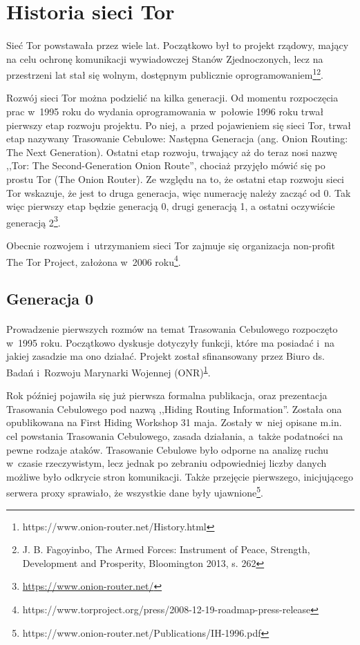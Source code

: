 \section{Historia sieci Tor}\paragraph{}

Sieć Tor powstawała przez wiele lat. Początkowo był to projekt rządowy, mający na celu ochronę komunikacji wywiadowczej Stanów Zjednoczonych, lecz na przestrzeni lat stał się wolnym, dostępnym publicznie oprogramowaniem\footnote{https://www.onion-router.net/History.html\label{hist}}\footnote{J. B. Fagoyinbo, The Armed Forces: Instrument of Peace, Strength, Development and Prosperity, Bloomington 2013, s. 262}. 

Rozwój sieci Tor można podzielić na kilka generacji. Od momentu rozpoczęcia prac w~1995 roku do wydania oprogramowania w~połowie 1996 roku trwał pierwszy etap rozwoju projektu. Po niej, a~przed pojawieniem się sieci Tor, trwał etap nazywany Trasowanie Cebulowe: Następna Generacja (ang. Onion Routing: The Next Generation). Ostatni etap rozwoju, trwający aż do teraz nosi nazwę ,,Tor: The Second-Generation Onion Route'', chociaż przyjęło mówić się po prostu Tor (The Onion Router). Ze względu na to, że ostatni etap rozwoju sieci Tor wskazuje, że jest to druga generacja, więc numerację należy zacząć od 0. Tak więc pierwszy etap będzie generacją 0, drugi generacją 1, a ostatni oczywiście generacją 2\footnote{\url{https://www.onion-router.net/}\label{onionrouter}}.

Obecnie rozwojem i~utrzymaniem sieci Tor zajmuje się organizacja non-profit The Tor Project, założona w~2006 roku\footnote{https://www.torproject.org/press/2008-12-19-roadmap-press-release}.

\subsection{Generacja 0}\paragraph{}
Prowadzenie pierwszych rozmów na temat Trasowania Cebulowego rozpoczęto w~1995 roku. Początkowo dyskusje dotyczyły funkcji, które ma posiadać i~na jakiej zasadzie ma ono działać. Projekt został sfinansowany przez Biuro ds. Badań i~Rozwoju Marynarki Wojennej (ONR)\textsuperscript{\ref{hist}}.

Rok później pojawiła się już pierwsza formalna publikacja, oraz prezentacja Trasowania Cebulowego pod nazwą ,,Hiding Routing Information''. Została ona opublikowana na First Hiding Workshop 31 maja. Zostały w~niej opisane m.in. cel powstania Trasowania Cebulowego, zasada działania, a~także podatności na pewne rodzaje ataków. Trasowanie Cebulowe było odporne na analizę ruchu w~czasie rzeczywistym, lecz jednak po zebraniu odpowiedniej liczby danych możliwe było odkrycie stron komunikacji. Także przejęcie pierwszego, inicjującego serwera proxy sprawiało, że wszystkie dane były ujawnione\footnote{https://www.onion-router.net/Publications/IH-1996.pdf\label{hri}}.

